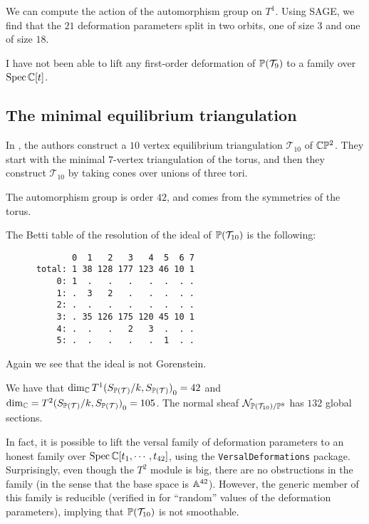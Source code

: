 We can compute the action of the automorphism group on $T^1$. Using SAGE, we find that the $21$ deformation parameters split in two orbits, one of size $3$ and one of size $18$.

I have not been able to lift any first-order deformation of $\P(\mathcal T_9)$ to a family over $\Spec \C[t]$. 

\subsection{The minimal equilibrium triangulation}

In \cite{banchoff_equilibrium}, the authors construct a $10$ vertex equilibrium triangulation $\mathcal T_{10}$  of $\C \P^2$. They start with the minimal $7$-vertex triangulation of the torus, and then they construct $\mathcal T_{10}$ by taking cones over unions of three tori.

The automorphism group is order $42$, and comes from the symmetries of the torus. 

The Betti table of the resolution of the ideal of $\P(\mathcal T_{10})$ is the following:
\begin{verbatim}
             0  1   2   3   4  5  6 7
      total: 1 38 128 177 123 46 10 1
          0: 1  .   .   .   .  .  . .
          1: .  3   2   .   .  .  . .
          2: .  .   .   .   .  .  . .
          3: . 35 126 175 120 45 10 1
          4: .  .   .   2   3  .  . .
          5: .  .   .   .   .  1  . .
\end{verbatim}

Again we see that the ideal is not Gorenstein.

\begin{proposition}
We have that $\dim_\C  {T^1(S_{\P(\mathcal T)}/k, S_{\P(\mathcal T)})}_0=42$ and $\dim_\C = {T^2(S_{\P(\mathcal T)}/k, S_{\P(\mathcal T)})}_0=105$. The normal sheaf $\mathcal N_{\P(\mathcal T_{10})/\P^{8}}$ has $132$ global sections.
\end{proposition}

In fact, it is possible to lift the versal family of deformation parameters to an honest family over $\Spec \C[t_1,\cdots,t_{42}]$, using the \texttt{VersalDeformations} package. Surprisingly, even though the $T^2$ module is big, there are no obstructions in the family (in the sense that the base space is $\A^{42}$). However, the generic member of this family is reducible (verified in \MM for ``random'' values of the deformation parameters), implying that $\P(\mathcal T_{10})$ is not smoothable.

